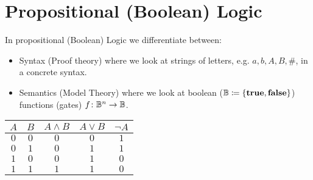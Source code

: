 
% 

\section{Propositional (Boolean) Logic}
In propositional (Boolean) Logic we differentiate between:
\begin{itemize}
    \item Syntax (Proof theory) where we look at strings of letters, e.g.  $ a, b, A, B, \# $, in a concrete syntax.
    \item  Semantics (Model Theory) where we look at boolean ($\mathbb{B}\coloneqq \{\mathbf{true},\mathbf{false} \}$) functions (gates) $f\colon \mathbb{B}^n\to \mathbb{B}$.
\end{itemize}

\begin{center}
    \begin{tabular}{|c|c|c|c|c|}
\hline
$A$ & $B$ & $A \land B$  & $A \lor B$ & $\neg A$\\
\hline
$0$ & $0$ & $0$ & $0$ & $1$ \\
$0$ & $1$ & $0$ & $1$ & $1$ \\
$1$ & $0$ & $0$ & $1$ & $0$ \\
$1$ & $1$ & $1$ & $1$ & $0$ \\
\hline
\end{tabular}
\end{center}









